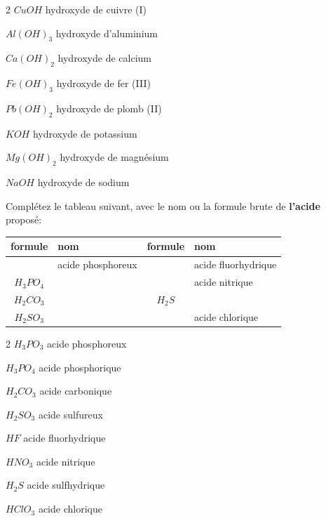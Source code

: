 \documentclass[
  11pt,
  a4paper,
  openany]{book}
\begin{document}
\begin{Answer}

\begin{multicols}{2}
\(CuOH\) hydroxyde de cuivre (I)

\(Al(OH)_3\) hydroxyde d'aluminium

\(Ca(OH)_2\) hydroxyde de calcium

\(Fe(OH)_3\) hydroxyde de fer (III)

\(Pb(OH)_2\) hydroxyde de plomb (II)

\(KOH\) hydroxyde de potassium

\(Mg(OH)_2\) hydroxyde de magnésium

\(NaOH\) hydroxyde de sodium

\end{multicols}

\end{Answer}

\begin{Exercise}
Complétez le tableau suivant, avec le nom ou la formule brute de \textbf{l'acide} proposé:

\end{Exercise}

\begin{longtable}[]{@{}clcl@{}}
\toprule\noalign{}
formule & nom & formule & nom \\
\midrule\noalign{}
\endhead
\bottomrule\noalign{}
\endlastfoot
& acide phosphoreux & & acide fluorhydrique \\
\(H_3PO_4\) & & & acide nitrique \\
\(H_2CO_3\) & & \(H_2S\) & \\
\(H_2SO_3\) & & & acide chlorique \\
\end{longtable}

\begin{Answer}

\begin{multicols}{2}
\(H_3PO_3\) acide phosphoreux

\(H_3PO_4\) acide phosphorique

\(H_2CO_3\) acide carbonique

\(H_2SO_3\) acide sulfureux

\(HF\) acide fluorhydrique

\(HNO_3\) acide nitrique

\(H_2S\) acide sulfhydrique

\(HClO_3\) acide chlorique

\end{multicols}

\newpage

\end{Answer}
\end{document}
